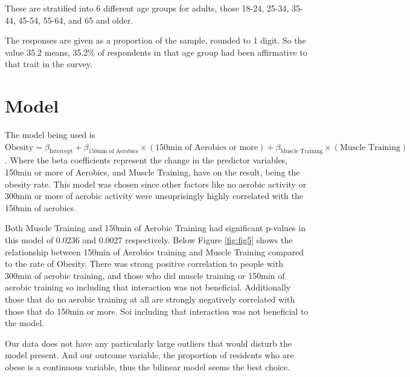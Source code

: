 \documentclass[
]{article}
\begin{document}
These are stratified into 6 different age groups for adults, those 18-24, 25-34, 35-44, 45-54, 55-64, and 65 and older.

The responses are given as a proportion of the sample, rounded to 1 digit. So the value 35.2 means, 35.2\% of respondents in that age group had been affirmative to that trait in the survey.

\newpage

\hypertarget{Model}{%
\section{Model}\label{Model}}

The model being used is \(\text{Obesity}=\beta_{\text{Intercept}}+\beta_{\text{150min of Aerobics}}\times (\text{150min of Aerobics or more})+\beta_{\text{Muscle Training}}\times (\text{Muscle Training})\). Where the beta coefficients represent the change in the predictor variables, 150min or more of Aerobics, and Muscle Training, have on the result, being the obesity rate. This model was chosen since other factors like no aerobic activity or 300min or more of aerobic activity were unsuprisingly highly correlated with the 150min of aerobics.

Both Muscle Training and 150min of Aerobic Training had significant p-values in this model of 0.0236 and 0.0027 respectively. Below Figure \ref{fig:fig5} shows the relationship between 150min of Aerobics training and Muscle Training compared to the rate of Obesity. There was strong positive correlation to people with 300min of aerobic training, and those who did muscle training or 150min of aerobic training so including that interaction was not beneficial. Additionally those that do no aerobic training at all are strongly negatively correlated with those that do 150min or more. Soi including that interaction was not beneficial to the model.

Our data does not have any particularly large outliers that would disturb the model present. And our outcome variable, the proportion of residents who are obese is a continuous variable, thus the bilinear model seems the best choice.
\end{document}
